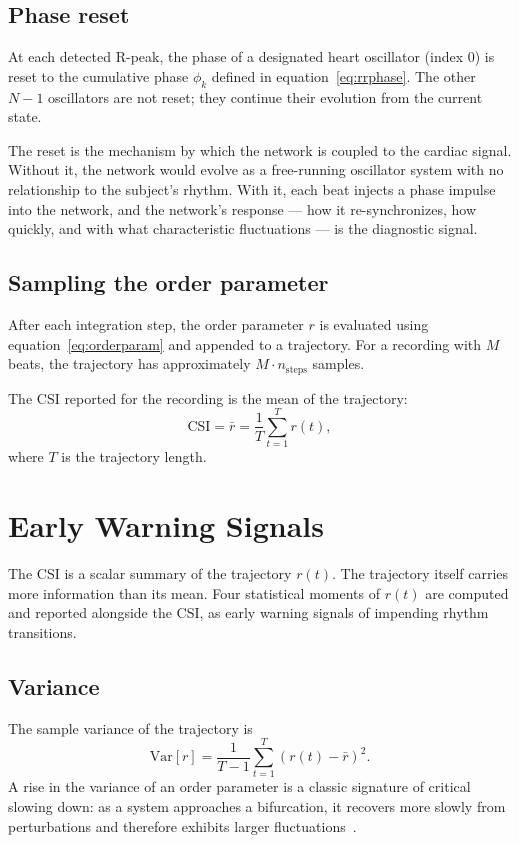 \documentclass[11pt]{article}
\begin{document}
\subsection{Phase reset}

At each detected R-peak, the phase of a designated heart oscillator
(index 0) is reset to the cumulative phase $\phi_k$ defined in
equation~\eqref{eq:rrphase}. The other $N-1$ oscillators are not reset;
they continue their evolution from the current state.

The reset is the mechanism by which the network is coupled to the
cardiac signal. Without it, the network would evolve as a free-running
oscillator system with no relationship to the subject's rhythm. With
it, each beat injects a phase impulse into the network, and the
network's response --- how it re-synchronizes, how quickly, and with
what characteristic fluctuations --- is the diagnostic signal.

\subsection{Sampling the order parameter}

After each integration step, the order parameter $r$ is evaluated using
equation~\eqref{eq:orderparam} and appended to a trajectory. For a
recording with $M$ beats, the trajectory has approximately
$M \cdot n_{\text{steps}}$ samples.

The CSI reported for the recording is the mean of the trajectory:
\begin{equation}
\mathrm{CSI} = \bar{r} = \frac{1}{T} \sum_{t=1}^{T} r(t),
\label{eq:csi}
\end{equation}
where $T$ is the trajectory length.

\section{Early Warning Signals}\label{sec:ews}

The CSI is a scalar summary of the trajectory $r(t)$. The trajectory
itself carries more information than its mean. Four statistical moments
of $r(t)$ are computed and reported alongside the CSI, as early warning
signals of impending rhythm transitions.

\subsection{Variance}

The sample variance of the trajectory is
\begin{equation}
\mathrm{Var}[r] = \frac{1}{T-1} \sum_{t=1}^{T} (r(t) - \bar{r})^2.
\label{eq:var}
\end{equation}
A rise in the variance of an order parameter is a classic signature of
critical slowing down: as a system approaches a bifurcation, it
recovers more slowly from perturbations and therefore exhibits larger
fluctuations~\cite{scheffer2009}.
\end{document}
